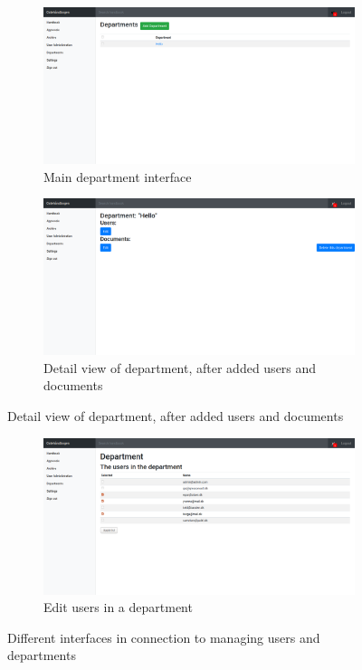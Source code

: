 \begin{figure}[H]\ContinuedFloat
	\centering
	\begin{subfigure}[b]{0.48\textwidth}
		\includegraphics[width=\textwidth]{billeder/iteration2Prototyper/Dep1.png}
		\caption{Main department interface}
		\label{fig:4-Dep1}
	\end{subfigure}
	\quad
	\begin{subfigure}[b]{0.48\textwidth}
		\includegraphics[width=\textwidth]{billeder/iteration2Prototyper/Dep2.png}
		\caption{Detail view of department, after added users and documents}
		\label{fig:4-Dep2}
	\end{subfigure}
\end{figure}
\begin{figure}[H]\ContinuedFloat
	\centering
	\begin{subfigure}[b]{0.48\textwidth}
		\includegraphics[width=\textwidth]{billeder/iteration2Prototyper/Dep3.png}
		\caption{Edit users in a department}
		\label{fig:4-Dep3}
	\end{subfigure}
	\caption{Different interfaces in connection to managing users and departments}\label{fig:4-DepUEdit}
\end{figure}
